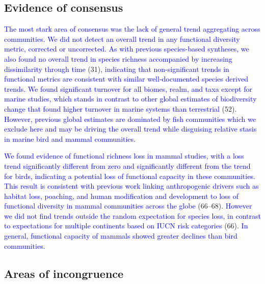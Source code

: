 \documentclass{article}
\begin{document}
\hypertarget{evidence-of-consensus}{%
\subsection{Evidence of consensus}\label{evidence-of-consensus}}

\textcolor{blue}{The most stark area of consensus was the lack of general trend aggregating across communities. We did not detect an overall trend in any functional diversity metric, corrected or uncorrected. As with previous species-based syntheses, we also found no overall trend in species richness accompanied by increasing dissimilarity through time}
(31)\textcolor{blue}{, indicating that non-significant trends in functional metrics are consistent with similar well-documented species derived trends. We found significant turnover for all biomes, realm, and taxa except for marine studies, which stands in contrast to other global estimates of biodiversity change that found higher turnover in marine systems than terrestrial}
(52).
\textcolor{blue}{However, previous global estimates are dominated by fish communities which we exclude here and may be driving the overall trend while disguising relative stasis in marine bird and mammal communities.}

\textcolor{blue}{We found evidence of functional richness loss in mammal studies, with a loss trend significantly different from zero and significantly different from the trend for birds, indicating a potential loss of functional capacity in these communities. This result is consistent with previous work linking anthropogenic drivers such as habitat loss, poaching, and human modification and development to loss of functional diversity in mammal communities across the globe}
(66--68).
\textcolor{blue}{However we did not find trends outside the random expectation for species loss, in contrast to expectations for multiple continents based on IUCN risk categories}
(66).
\textcolor{blue}{In general, functional capacity of mammals showed greater declines than bird communities.}

\hypertarget{areas-of-incongruence}{%
\subsection{Areas of incongruence}\label{areas-of-incongruence}}
\end{document}

